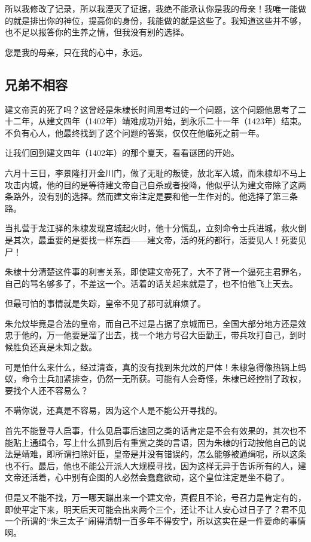 \begin{multicols}{\theparacolNo}
所以我修改了记录，所以我湮灭了证据，我绝不能承认你是我的母亲！我唯一能做的就是排出你的神位，提高你的身份，我能做的就是这些了。我知道这些并不够，也不足以报答你的生养之情，但我没有别的选择。

您是我的母亲，只在我的心中，永远。

\subsection{兄弟不相容}
建文帝真的死了吗？这曾经是朱棣长时间思考过的一个问题，这个问题他思考了二十二年，从建文四年（1402年）靖难成功开始，到永乐二十一年（1423年）结束。不负有心人，他最终找到了这个问题的答案，仅仅在他临死之前一年。

让我们回到建文四年（1402年）的那个夏天，看看谜团的开始。

六月十三日，李景隆打开金川门，做了无耻的叛徒，放北军入城，而朱棣却不马上攻击内城，他的目的是等待建文帝自己自杀或者投降，他似乎认为建文帝除了这两条路外，没有别的选择。然而建文帝注定是要和他一生作对的。他选择了第三条路。

当扎营于龙江驿的朱棣发现宫城起火时，他十分慌乱，立刻命令士兵进城，救火倒是其次，最重要的是要找一样东西——建文帝，活的死的都行，活要见人！死要见尸！

朱棣十分清楚这件事的利害关系，即使建文帝死了，大不了背一个逼死主君罪名，自己的骂名够多了，不差这一个。活着的话关起来就是了，也不怕他飞上天去。

但最可怕的事情就是失踪，皇帝不见了那可就麻烦了。

朱允炆毕竟是合法的皇帝，而自己不过是占据了京城而已，全国大部分地方还是效忠于他的，万一他要是溜了出去，找一个地方号召大臣勤王，带兵攻打自己，到时候胜负还真是未知之数。

可是怕什么来什么，经过清查，真的没有找到朱允炆的尸体！朱棣急得像热锅上蚂蚁，命令士兵加紧排查，仍然一无所获。可能有人会奇怪，朱棣已经控制了政权，要找个人还不容易么？

不瞒你说，还真是不容易，因为这个人是不能公开寻找的。

首先不能登寻人启事，什么见启事后速回之类的话肯定是不会有效果的，其次也不能贴上通缉令，写上什么抓到后有重赏之类的言语，因为朱棣的行动按他自己的说法是靖难，即所谓扫除奸臣，皇帝是并没有错误的，怎么能够被通缉呢，所以这条也不行。最后，他也不能公开派人大规模寻找，因为这样无异于告诉所有的人，建文帝还活着，心中别有企图的人必然会蠢蠢欲动，这个皇位注定是坐不稳了。

但是又不能不找，万一哪天蹦出来一个建文帝，真假且不论，号召力是肯定有的，即使平定下来，明天后天可能会出来两个三个，还让不让人安心过日子了？君不见一个所谓的“朱三太子”闹得清朝一百多年不得安宁，所以这实在是一件要命的事情啊。


\end{multicols}
